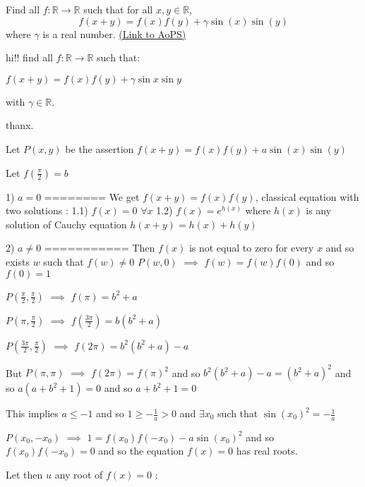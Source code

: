 \begin{problem}
	Find all $ f: \mathbb{R}\to\mathbb{R}$ such that for all $x,y \in \mathbb R$,
\[ f(x+y) = f(x)f(y) + \gamma\sin{(x)}\sin{(y)}\]
where $ \gamma$ is a real number.
	\flushright \href{https://artofproblemsolving.com/community/c6h311129}{(Link to AoPS)}
\end{problem}



\begin{solution}
	\begin{tcolorbox}hi!!
find all $ f: \mathbb{R}\to\mathbb{R}$ such that:

   $ f(x + y) = f(x)f(y) + \gamma\sin{x}\sin{y}$    

  with $ \gamma\in{\mathbb{R}}$.

thanx.\end{tcolorbox}

Let $ P(x,y)$ be the assertion $ f(x + y) = f(x)f(y) + a\sin(x)\sin(y)$

Let $ f(\frac {\pi}2) = b$

1) $ a = 0$
========
We get $ f(x + y) = f(x)f(y)$, classical equation with two solutions :
1.1) $ f(x) = 0$ $ \forall x$
1.2) $ f(x) = e^{h(x)}$ where $ h(x)$ is any solution of Cauchy equation $ h(x + y) = h(x) + h(y)$

2) $ a\ne 0$
===========
Then $ f(x)$ is not equal to zero for every $ x$ and so exists $ w$ such that $ f(w)\ne 0$
$ P(w,0)$ $ \implies$ $ f(w) = f(w)f(0)$ and so $ f(0) = 1$

$ P(\frac {\pi}2,\frac {\pi}2)$ $ \implies$ $ f(\pi) = b^2 + a$

$ P(\pi,\frac {\pi}2)$ $ \implies$ $ f(\frac {3\pi}2) = b(b^2 + a)$

$ P(\frac {3\pi}2,\frac {\pi}2)$ $ \implies$ $ f(2\pi) = b^2(b^2 + a) - a$

But $ P(\pi,\pi)$ $ \implies$ $ f(2\pi) = f(\pi)^2$ and so $ b^2(b^2 + a) - a = (b^2 + a)^2$ and so $ a(a + b^2 + 1) = 0$ and so $ a + b^2 + 1 = 0$

This implies $ a\le - 1$ and so $ 1\ge - \frac 1a > 0$ and $ \exists x_0$ such that $ \sin(x_0)^2 = - \frac 1a$

$ P(x_0, - x_0)$ $ \implies$ $ 1 = f(x_0)f( - x_0) - a\sin(x_0)^2$ and so $ f(x_0)f( - x_0) = 0$ and so the equation $ f(x) = 0$ has real roots.

Let then $ u$ any root of $ f(x) = 0$ :


\end{solution}
